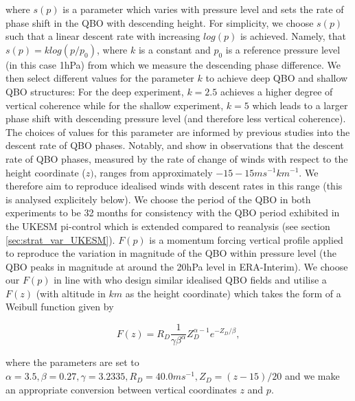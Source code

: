 \noindent where $s(p)$ is a parameter which varies with pressure level and sets the rate of phase shift in the QBO with descending height. For simplicity, we choose $s(p)$ such that a linear descent rate with increasing $log(p)$ is achieved. Namely, that $s(p) = k log(p/p_{0})$, where $k$ is a constant and $p_{0}$ is a reference pressure level (in this case 1hPa) from which we measure the descending phase difference. We then select different values for the parameter $k$ to achieve deep QBO and shallow QBO structures: For the deep experiment, $k = 2.5$ achieves a higher degree of vertical coherence while for the shallow experiment, $k = 5$ which leads to a larger phase shift with descending pressure level (and therefore less vertical coherence). The choices of values for this parameter are informed by previous studies into the descent rate of QBO phases. Notably, \cite{kinnersleyDescent1996} and \cite{coySeasonal2020} show in observations that the descent rate of QBO phases, measured by the rate of change of winds with respect to the height coordinate ($z)$, ranges from approximately $-15-15ms^{-1}km^{-1}$. We therefore aim to reproduce idealised winds with descent rates in this range (this is analysed explicitely below). We choose the period of the QBO in both experiments to be 32 months for consistency with the QBO period exhibited in the UKESM pi-control which is extended compared to reanalysis (see section \ref{sec:strat_var_UKESM}). $F(p)$ is a momentum forcing vertical profile applied to reproduce the variation in magnitude of the QBO within pressure level (the QBO peaks in magnitude at around the 20hPa level in ERA-Interim). We choose our $F(p)$ in line with \cite{pascoeQuasibiennial2005b} who design similar idealised QBO fields and utilise a $F(z)$ (with altitude in $km$ as the height coordinate) which takes the form of a Weibull function given by

\begin{equation} \label{eq:vertical_profile}
F(z) = R_D \frac{1}{\gamma \beta^\alpha}  Z_D^{\alpha-1}  e^{-Z_D/\beta},
\end{equation}

\noindent where the parameters are set to $\alpha = 3.5, \beta = 0.27, \gamma = 3.2335, R_D = 40.0 ms^{-1}, Z_{D} = (z - 15)/20$ and we make an appropriate conversion between vertical coordinates $z$ and $p$.

